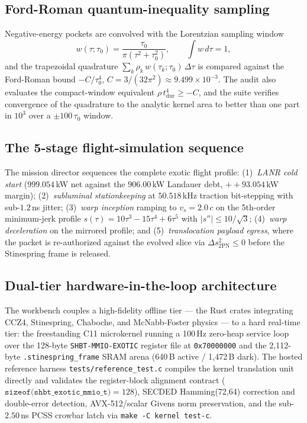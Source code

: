 \documentclass[aps,pra,10pt,onecolumn,superscriptaddress,nofootinbib,longbibliography,floatfix]{revtex4-2}
\newcommand{\ExoticLanrNetKw}{999.054}%
\newcommand{\ExoticLanrDebtKw}{906.00}%
\newcommand{\ExoticLanrSurplusKw}{+93.054}%
\newcommand{\ExoticBitStepKhz}{50.518}%
\begin{document}
\subsection{Ford-Roman quantum-inequality sampling}

Negative-energy pockets are convolved with the Lorentzian sampling window
\begin{equation}
w(\tau;\tau_0)=\frac{\tau_0}{\pi(\tau^2+\tau_0^2)},\qquad
\int w\,d\tau = 1,
\end{equation}
and the trapezoidal quadrature $\sum_k \rho_k\,w(\tau_k;\tau_0)\,\Delta\tau$
is compared against the Ford-Roman bound $-C/\tau_0^{4}$,
$C=3/(32\pi^2)\approx 9.499\times10^{-3}$.  The audit also evaluates the
compact-window equivalent $\rho\,t_{\mathrm{dur}}^{4}\ge -C$, and the suite
verifies convergence of the quadrature to the analytic kernel area to better
than one part in $10^{3}$ over a $\pm100\,\tau_0$ window.

\subsection{The 5-stage flight-simulation sequence}

The mission director sequences the complete exotic flight profile:
(1)~\emph{LANR cold start} ($\ExoticLanrNetKw$\,kW net against the
$\ExoticLanrDebtKw$\,kW Landauer debt, $+\ExoticLanrSurplusKw$\,kW margin);
(2)~\emph{subluminal stationkeeping} at $\ExoticBitStepKhz$\,kHz traction
bit-stepping with sub-$1.2$\,ns jitter; (3)~\emph{warp inception} ramping to
$v_s=2.0\,c$ on the 5th-order minimum-jerk profile
$s(\tau)=10\tau^3-15\tau^4+6\tau^5$ with $|s''|\le 10/\sqrt{3}$;
(4)~\emph{warp deceleration} on the mirrored profile; and
(5)~\emph{translocation payload egress}, where the packet is re-authorized
against the evolved slice via $\Delta s^2_{\mathrm{2PN}}\le 0$ before the
Stinespring frame is released.

\subsection{Dual-tier hardware-in-the-loop architecture}

The workbench couples a high-fidelity offline tier --- the Rust crates
integrating CCZ4, Stinespring, Chaboche, and McNabb-Foster physics --- to a
hard real-time tier: the freestanding C11 microkernel running a 100\,Hz
zero-heap service loop over the 128-byte \texttt{SHBT-MMIO-EXOTIC} register
file at \texttt{0x70000000} and the 2{,}112-byte \texttt{.stinespring\_frame}
SRAM arena (640\,B active / 1{,}472\,B dark).  The hosted reference harness
\texttt{tests/reference\_test.c} compiles the kernel translation unit
directly and validates the register-block alignment contract
($\texttt{sizeof(shbt\_exotic\_mmio\_t)}=128$), SECDED Hamming(72,64)
correction and double-error detection, AVX-512/scalar Givens norm
preservation, and the sub-$2.50$\,ns PCSS crowbar latch via
\texttt{make -C kernel test-c}.
\end{document}
